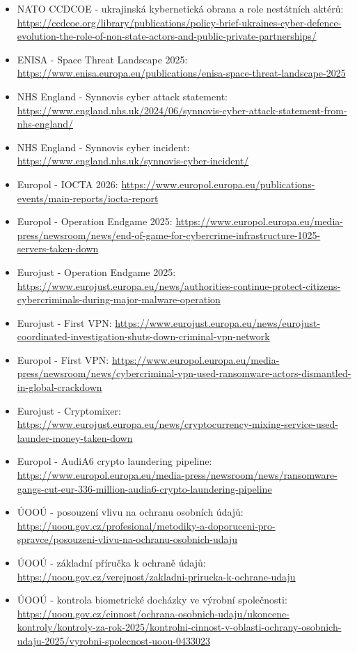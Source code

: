 \documentclass[11pt,a4paper]{article}
\begin{document}
\begin{itemize}
  \item NATO CCDCOE - ukrajinská kybernetická obrana a role nestátních aktérů: \url{https://ccdcoe.org/library/publications/policy-brief-ukraines-cyber-defence-evolution-the-role-of-non-state-actors-and-public-private-partnerships/}
  \item ENISA - Space Threat Landscape 2025: \url{https://www.enisa.europa.eu/publications/enisa-space-threat-landscape-2025}
  \item NHS England - Synnovis cyber attack statement: \url{https://www.england.nhs.uk/2024/06/synnovis-cyber-attack-statement-from-nhs-england/}
  \item NHS England - Synnovis cyber incident: \url{https://www.england.nhs.uk/synnovis-cyber-incident/}
  \item Europol - IOCTA 2026: \url{https://www.europol.europa.eu/publications-events/main-reports/iocta-report}
  \item Europol - Operation Endgame 2025: \url{https://www.europol.europa.eu/media-press/newsroom/news/end-of-game-for-cybercrime-infrastructure-1025-servers-taken-down}
  \item Eurojust - Operation Endgame 2025: \url{https://www.eurojust.europa.eu/news/authorities-continue-protect-citizens-cybercriminals-during-major-malware-operation}
  \item Eurojust - First VPN: \url{https://www.eurojust.europa.eu/news/eurojust-coordinated-investigation-shuts-down-criminal-vpn-network}
  \item Europol - First VPN: \url{https://www.europol.europa.eu/media-press/newsroom/news/cybercriminal-vpn-used-ransomware-actors-dismantled-in-global-crackdown}
  \item Eurojust - Cryptomixer: \url{https://www.eurojust.europa.eu/news/cryptocurrency-mixing-service-used-launder-money-taken-down}
  \item Europol - AudiA6 crypto laundering pipeline: \url{https://www.europol.europa.eu/media-press/newsroom/news/ransomware-gangs-cut-eur-336-million-audia6-crypto-laundering-pipeline}
  \item ÚOOÚ - posouzení vlivu na ochranu osobních údajů: \url{https://uoou.gov.cz/profesional/metodiky-a-doporuceni-pro-spravce/posouzeni-vlivu-na-ochranu-osobnich-udaju}
  \item ÚOOÚ - základní příručka k ochraně údajů: \url{https://uoou.gov.cz/verejnost/zakladni-prirucka-k-ochrane-udaju}
  \item ÚOOÚ - kontrola biometrické docházky ve výrobní společnosti: \url{https://uoou.gov.cz/cinnost/ochrana-osobnich-udaju/ukoncene-kontroly/kontroly-za-rok-2025/kontrolni-cinnost-v-oblasti-ochrany-osobnich-udaju-2025/vyrobni-spolecnost-uoou-0433023}

\end{itemize}
\end{document}
